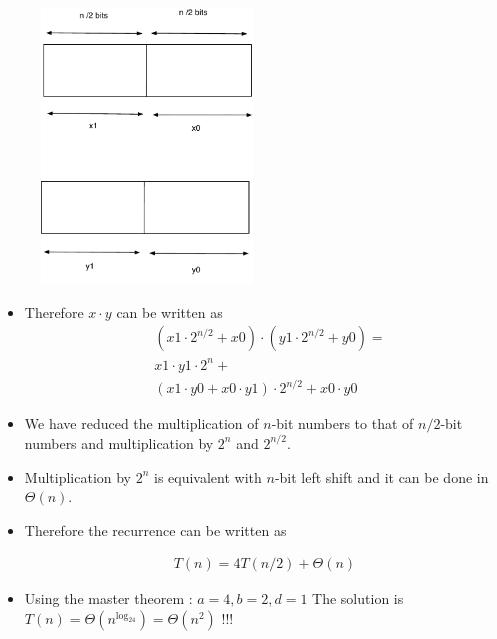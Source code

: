 \documentclass{beamer}
\begin{document}
\begin{frame}
    \begin{figure}[h]
    \centering
\includegraphics[width=0.5\textwidth]{divide-figs/multiplication}
  \end{figure}

\end{frame}
\begin{frame}
  \begin{itemize}
  \item Therefore $x\cdot y$ can be written as
    \begin{align*}
      &(x1\cdot 2^{n/2}+x0)\cdot(y1\cdot 2^{n/2}+y0)=\\
      &x1\cdot y1 \cdot 2^n+\\
      &(x1\cdot y0+x0\cdot y1)\cdot 2^{n/2}+x0\cdot y0
    \end{align*}
\item We have reduced the multiplication of $n$-bit numbers to that of $n/2$-bit numbers and multiplication by $2^n$ and $2^{n/2}$.
\item Multiplication by $2^n$ is equivalent with $n$-bit left shift and it can be done in $\Theta(n)$.
\item Therefore the recurrence can be written as

  \begin{align*}
    T(n)=4T(n/2)+\Theta(n)
  \end{align*}
\item Using the master theorem : $a=4,b=2,d=1$ The solution is $T(n)=\Theta(n^{\log_24})=\Theta(n^2)$ !!!
  \end{itemize}
\end{frame}
\end{document}
